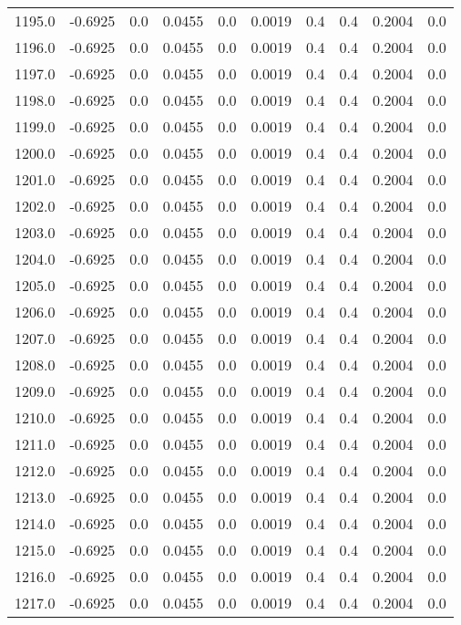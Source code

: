 \begin{longtable}{lrrrrrrrrr}
1195.0 & -0.6925 & 0.0 & 0.0455 & 0.0 & 0.0019 & 0.4 & 0.4 & 0.2004 & 0.0 \\
1196.0 & -0.6925 & 0.0 & 0.0455 & 0.0 & 0.0019 & 0.4 & 0.4 & 0.2004 & 0.0 \\
1197.0 & -0.6925 & 0.0 & 0.0455 & 0.0 & 0.0019 & 0.4 & 0.4 & 0.2004 & 0.0 \\
1198.0 & -0.6925 & 0.0 & 0.0455 & 0.0 & 0.0019 & 0.4 & 0.4 & 0.2004 & 0.0 \\
1199.0 & -0.6925 & 0.0 & 0.0455 & 0.0 & 0.0019 & 0.4 & 0.4 & 0.2004 & 0.0 \\
1200.0 & -0.6925 & 0.0 & 0.0455 & 0.0 & 0.0019 & 0.4 & 0.4 & 0.2004 & 0.0 \\
1201.0 & -0.6925 & 0.0 & 0.0455 & 0.0 & 0.0019 & 0.4 & 0.4 & 0.2004 & 0.0 \\
1202.0 & -0.6925 & 0.0 & 0.0455 & 0.0 & 0.0019 & 0.4 & 0.4 & 0.2004 & 0.0 \\
1203.0 & -0.6925 & 0.0 & 0.0455 & 0.0 & 0.0019 & 0.4 & 0.4 & 0.2004 & 0.0 \\
1204.0 & -0.6925 & 0.0 & 0.0455 & 0.0 & 0.0019 & 0.4 & 0.4 & 0.2004 & 0.0 \\
1205.0 & -0.6925 & 0.0 & 0.0455 & 0.0 & 0.0019 & 0.4 & 0.4 & 0.2004 & 0.0 \\
1206.0 & -0.6925 & 0.0 & 0.0455 & 0.0 & 0.0019 & 0.4 & 0.4 & 0.2004 & 0.0 \\
1207.0 & -0.6925 & 0.0 & 0.0455 & 0.0 & 0.0019 & 0.4 & 0.4 & 0.2004 & 0.0 \\
1208.0 & -0.6925 & 0.0 & 0.0455 & 0.0 & 0.0019 & 0.4 & 0.4 & 0.2004 & 0.0 \\
1209.0 & -0.6925 & 0.0 & 0.0455 & 0.0 & 0.0019 & 0.4 & 0.4 & 0.2004 & 0.0 \\
1210.0 & -0.6925 & 0.0 & 0.0455 & 0.0 & 0.0019 & 0.4 & 0.4 & 0.2004 & 0.0 \\
1211.0 & -0.6925 & 0.0 & 0.0455 & 0.0 & 0.0019 & 0.4 & 0.4 & 0.2004 & 0.0 \\
1212.0 & -0.6925 & 0.0 & 0.0455 & 0.0 & 0.0019 & 0.4 & 0.4 & 0.2004 & 0.0 \\
1213.0 & -0.6925 & 0.0 & 0.0455 & 0.0 & 0.0019 & 0.4 & 0.4 & 0.2004 & 0.0 \\
1214.0 & -0.6925 & 0.0 & 0.0455 & 0.0 & 0.0019 & 0.4 & 0.4 & 0.2004 & 0.0 \\
1215.0 & -0.6925 & 0.0 & 0.0455 & 0.0 & 0.0019 & 0.4 & 0.4 & 0.2004 & 0.0 \\
1216.0 & -0.6925 & 0.0 & 0.0455 & 0.0 & 0.0019 & 0.4 & 0.4 & 0.2004 & 0.0 \\
1217.0 & -0.6925 & 0.0 & 0.0455 & 0.0 & 0.0019 & 0.4 & 0.4 & 0.2004 & 0.0 \\

\end{longtable}
